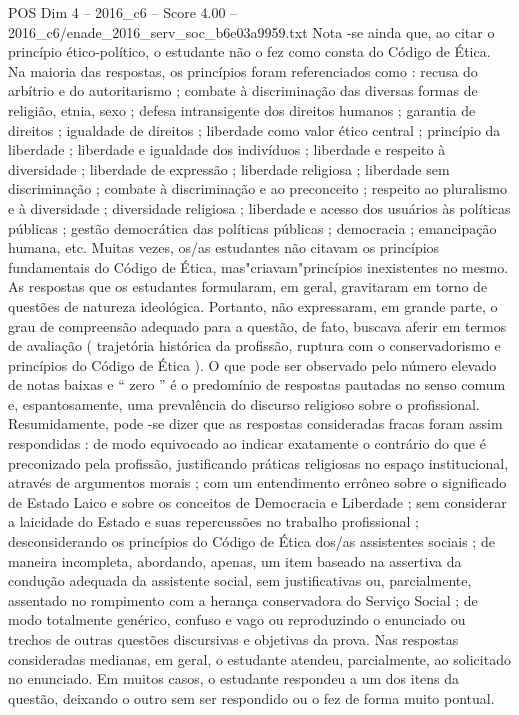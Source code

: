 \begin{textsample}{POS Dim 4 – 2016\_c6 – Score 4.00 – 2016\_c6/enade\_2016\_serv\_soc\_b6e03a9959.txt}
Nota -se ainda que, ao citar o princípio ético-político, o estudante não o fez como consta do Código de Ética.
Na maioria das respostas, os princípios foram referenciados como : recusa do arbítrio e do autoritarismo ; combate à discriminação das diversas formas de religião, etnia, sexo ; defesa intransigente dos direitos humanos ; garantia de direitos ; igualdade de direitos ; liberdade como valor ético central ; princípio da liberdade ; liberdade e igualdade dos indivíduos ; liberdade e respeito à diversidade ; liberdade de expressão ; liberdade religiosa ; liberdade sem discriminação ; combate à discriminação e ao preconceito ; respeito ao pluralismo e à diversidade ; diversidade religiosa ; liberdade e acesso dos usuários às políticas públicas ; gestão democrática das políticas públicas ; democracia ; emancipação humana, etc.
Muitas vezes, os/as estudantes não citavam os princípios fundamentais do Código de Ética, mas"criavam"princípios inexistentes no mesmo.
As respostas que os estudantes formularam, em geral, gravitaram em torno de questões de natureza ideológica.
Portanto, não expressaram, em grande parte, o grau de compreensão adequado para a questão, de fato, buscava aferir em termos de avaliação ( trajetória histórica da profissão, ruptura com o conservadorismo e princípios do Código de Ética ).
O que pode ser observado pelo número elevado de notas baixas e “ zero ” é o predomínio de respostas pautadas no senso comum e, espantosamente, uma prevalência do discurso religioso sobre o profissional.
Resumidamente, pode -se dizer que as respostas consideradas fracas foram assim respondidas : de modo equivocado ao indicar exatamente o contrário do que é preconizado pela profissão, justificando práticas religiosas no espaço institucional, através de argumentos morais ; com um entendimento errôneo sobre o significado de Estado Laico e sobre os conceitos de Democracia e Liberdade ; sem considerar a laicidade do Estado e suas repercussões no trabalho profissional ; desconsiderando os princípios do Código de Ética dos/as assistentes sociais ; de maneira incompleta, abordando, apenas, um item baseado na assertiva da condução adequada da assistente social, sem justificativas ou, parcialmente, assentado no rompimento com a herança conservadora do Serviço Social ; de modo totalmente genérico, confuso e vago ou reproduzindo o enunciado ou trechos de outras questões discursivas e objetivas da prova.
Nas respostas consideradas medianas, em geral, o estudante atendeu, parcialmente, ao solicitado no enunciado.
Em muitos casos, o estudante respondeu a um dos itens da questão, deixando o outro sem ser respondido ou o fez de forma muito pontual.

\end{textsample}
